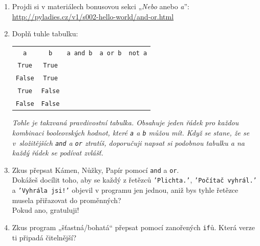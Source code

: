 \documentclass[a4paper,10pt]{article}
\newcommand\True{\texttt{True}}
\newcommand\False{\texttt{False}}
\begin{document}
\begin{enumerate}[resume]

\item Projdi si v materiálech bonusovou sekci „\emph{Nebo} anebo \emph{a}”:
    \\\url{http://pyladies.cz/v1/s002-hello-world/and-or.html}

\item Doplň tuhle tabulku:

    {
        \newcommand\rowend{\rule{0pt}{0.5cm}\\ \hline}
        \begin{tabular}{c|c||c|c|c}
        \arrayrulecolor{silver}
        \verb+a+ & \verb+b+ & \verb+a and b+ & \verb+a or b+ & \verb+not a+ \\
        \arrayrulecolor{black}\hline\arrayrulecolor{silver}
        \True & \True &  &  &  \rowend
        \False & \True &  &  &  \rowend
        \True & \False &  &  &  \rowend
        \False & \False &  &  &  \rowend
        \end{tabular}
    }

    \emph{\small Tohle je takzvaná \emph{pravdivostní tabulka}.
          Obsahuje jeden řádek pro každou kombinaci booleovských hodnot, které \texttt{a} a \texttt{b}
          můžou mít. Když se stane, že se v složitějších \texttt{and} a \texttt{or} ztratíš,
          doporučuji napsat si podobnou tabulku a na každý řádek se podívat zvlášť.}

\item Zkus přepsat Kámen, Nůžky, Papír pomocí \texttt{and} a \texttt{or}.
    \\Dokážeš docílit toho, aby se každý z řetězců \texttt{'Plichta.'},
    \texttt{'Počítač vyhrál.'} a \texttt{'Vyhrála jsi!'} objevil v programu jen jednou,
    aniž bys tyhle řetězce musela přiřazovat do proměnných?
    \\Pokud ano, gratuluji!

\item Zkus program „šťastná/bohatá“ přepsat pomocí zanořených \texttt{if}ů. Která verze ti připadá čitelnější?

\end{enumerate}
\end{document}
